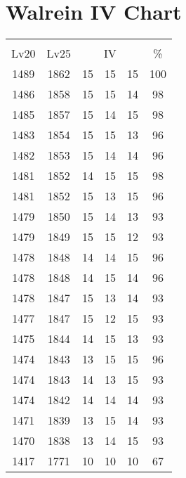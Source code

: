 \documentclass{article}%
\begin{document}
%
\normalsize%
\section{Walrein IV Chart}%
\label{sec:Walrein IV Chart}%
\renewcommand{\arraystretch}{1.5}%
\begin{tabular}{|c|c|c|c|c|c|}%
\hline%
\multicolumn{6}{|c|}{\textcolor{white}{ 
\linebreak{Walrein}
}%
\cellcolor{black}}\\%
\multicolumn{1}{|c}{Lv20}&\multicolumn{1}{c|}{Lv25}&\multicolumn{3}{c|}{IV}&\multicolumn{1}{|c|}{\%}\\%
\hline%
\rowcolor{color100}%
1489&1862&15&15&15&100\\%
\hline%
\rowcolor{color98}%
1486&1858&15&15&14&98\\%
\hline%
\rowcolor{color98}%
1485&1857&15&14&15&98\\%
\hline%
\rowcolor{color96}%
1483&1854&15&15&13&96\\%
\hline%
\rowcolor{color96}%
1482&1853&15&14&14&96\\%
\hline%
\rowcolor{color98}%
1481&1852&14&15&15&98\\%
\hline%
\rowcolor{color96}%
1481&1852&15&13&15&96\\%
\hline%
\rowcolor{color93}%
1479&1850&15&14&13&93\\%
\hline%
\rowcolor{color93}%
1479&1849&15&15&12&93\\%
\hline%
\rowcolor{color96}%
1478&1848&14&14&15&96\\%
\hline%
\rowcolor{color96}%
1478&1848&14&15&14&96\\%
\hline%
\rowcolor{color93}%
1478&1847&15&13&14&93\\%
\hline%
\rowcolor{color93}%
1477&1847&15&12&15&93\\%
\hline%
\rowcolor{color93}%
1475&1844&14&15&13&93\\%
\hline%
\rowcolor{color96}%
1474&1843&13&15&15&96\\%
\hline%
\rowcolor{color93}%
1474&1843&14&13&15&93\\%
\hline%
\rowcolor{color93}%
1474&1842&14&14&14&93\\%
\hline%
\rowcolor{color93}%
1471&1839&13&15&14&93\\%
\hline%
\rowcolor{color93}%
1470&1838&13&14&15&93\\%
\hline%
\rowcolor{color91}%
1417&1771&10&10&10&67\\%
\end{tabular}

%
\end{document}
